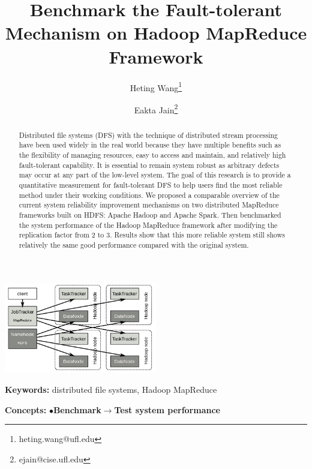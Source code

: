 \documentclass[11pt,twocolumn]{article}
\title{\textbf{Benchmark the Fault-tolerant Mechanism on Hadoop MapReduce Framework}}
\author{Heting Wang\thanks{heting.wang@ufl.edu} \and Eakta Jain\thanks{ejain@cise.ufl.edu}}
\providecommand{\keywords}[1]
{
  \textbf{Keywords:} #1
}
\providecommand{\concepts}[1]
{
  \textbf{Concepts:} #1
}
\begin{document}
\maketitle
\begin{strip}\centering
\includegraphics[width=0.5\textwidth]{architecture}
\end{strip}

\begin{abstract}
Distributed file systems (DFS) with the technique of distributed stream processing\cite{cherniack2003scalable} have been used widely in the real world because they have multiple benefits such as the flexibility of managing resources, easy to access and maintain, and relatively high fault-tolerant capability\cite{schneider1990implementing}. It is essential to remain system robust as arbitrary defects may occur at any part of the low-level system. The goal of this research is to provide a quantitative measurement for fault-tolerant DFS to help users find the most reliable method under their working conditions. We proposed a comparable overview of the current system reliability improvement mechanisms on two distributed MapReduce frameworks\cite{condie2010mapreduce,dean2010mapreduce} built on HDFS: Apache Hadoop\cite{5496972} and Apache Spark\cite{zaharia2010spark,Zaharia:2016:ASU:3013530.2934664}. Then benchmarked the system performance of the Hadoop MapReduce framework after modifying the replication factor from 2 to 3.
Results show that this more reliable system still shows relatively the same good performance compared with the original system.
\end{abstract}

\keywords{distributed file systems, Hadoop MapReduce}

\concepts{$\bullet$\textbf{Benchmark}$\rightarrow$\textbf{Test system performance}}
\end{document}
